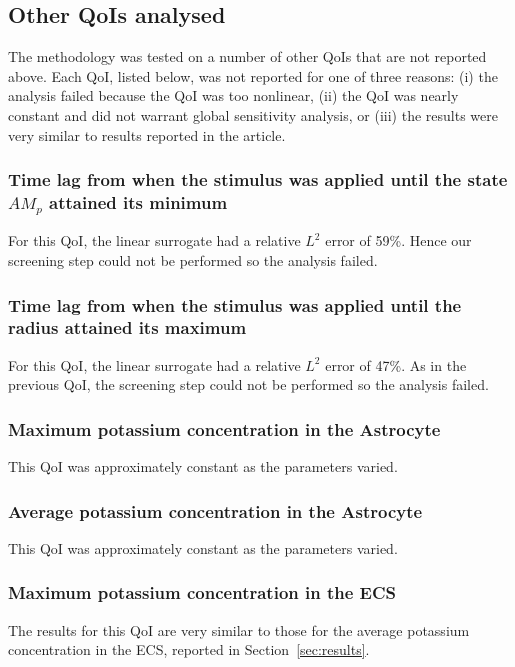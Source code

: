 \subsection{Other QoIs analysed}

The methodology was tested on a number of other QoIs that are not reported above. Each QoI, listed below, was not reported for one of three reasons: (i) the analysis failed because the QoI was too nonlinear, (ii) the QoI was nearly constant and did not warrant global sensitivity analysis, or (iii) the results were very similar to results reported in the article.

\subsubsection{Time lag from when the stimulus was applied until the state $AM_p$ attained its minimum}
For this QoI, the linear surrogate had a relative $L^2$ error of 59\%. Hence our screening step could not be performed so the analysis failed. 

\subsubsection{Time lag from when the stimulus was applied until the radius attained its maximum} 
For this QoI, the linear surrogate had a relative $L^2$ error of 47\%. As in the previous QoI, the screening step could not be performed so the analysis failed. 

\subsubsection{Maximum potassium concentration in the Astrocyte}
This QoI was approximately constant as the parameters varied.

\subsubsection{Average potassium concentration in the Astrocyte}
This QoI was approximately constant as the parameters varied.

\subsubsection{Maximum potassium concentration in the ECS}
The results for this QoI are very similar to those for the average potassium concentration in the ECS, reported in Section~\ref{sec:results}.


